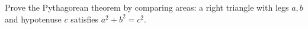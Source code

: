 Prove the Pythagorean theorem by comparing areas: a right triangle with legs $a,b$ and hypotenuse $c$ satisfies $a^2+b^2=c^2$.

